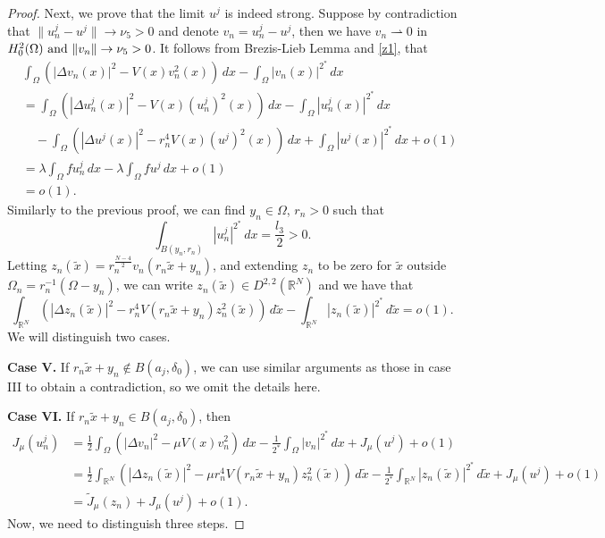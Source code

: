 \documentclass[reqno]{amsart}
\begin{document}
\begin{proof}
Next, we prove that the limit \(u^j\) is indeed strong. Suppose by contradiction that 
\(\|u_n^j-u^j\|\to \nu_5> 0\) and denote \(v_n=u_n^j-u^j\), then we have 
\(v_n\rightharpoonup 0\) in \(H^2_0(\Omega)$ and $\|v_n\|\to \nu_5> 0\).
It follows from Brezis-Lieb Lemma and \eqref{z1}, that
 \begin{align*}
&\int_{\Omega}\left( |\Delta v_n(x)|^2- V(x)v_n^2(x)\right)\, dx
 -\int_{\Omega}|v_n(x)|^{2^*}\,dx\\
&=\int_{\Omega}\left( |\Delta u^j_n(x)|^2-V(x)(u^j_n)^2(x)\right) \,dx
 -\int _{\Omega}|u^j_n(x)|^{2^*}\,dx\\
& \quad - \int_{\Omega}\left( |\Delta u^j(x)|^2-r_n^4 V(x)(u^j)^2(x)\right) \,dx
 +\int _{\Omega}|u^j(x)|^{2^*}\,dx+o(1)\\
&=\lambda \int_{\Omega} fu_n^j\,dx-\lambda \int_{\Omega} fu^j\,dx+o(1)\\
&=o(1).
\end{align*}
Similarly to the previous proof, we can find \(y_n\in \Omega\), \(r_n>0\) such that 
\[
 \int _{B(y_n, r_n)}|u_n^j|^{2^*}\,dx=\frac{l_3}{2}>0.
 \]
Letting \(z_n(\tilde{x})=r_n^{\frac{N-4}{2}}v_n(r_n\tilde{x}+y_n)\), 
and extending \(z_n\) to be zero for \(\tilde{x}\) outside 
\(\Omega_n=r_n^{-1}(\Omega-y_n)\), we can write 
\(z_n(\tilde{x})\in D^{2,2}(\mathbb{R}^N)\) and we have that
\begin{equation}\label{z2}
 \int_{\mathbb{R}^N}\left( |\Delta z_n(\tilde{x})|^2-r_n^4 V(r_n\tilde{x}+y_n)z_n^2(\tilde{x})\right)\, d\tilde{x}-\int _{\mathbb{R}^N}|z_n(\tilde{x})|^{2^*}\,d\tilde{x}=o(1).
\end{equation}
We will distinguish two cases.
\smallskip

\noindent \textbf{Case V.} 
If \(r_n\tilde{x}+y_n \notin B(a_j, \delta_0)\), we can use similar arguments as 
those in case III to obtain a contradiction,
so we omit the details here.
\smallskip

\noindent\textbf{Case VI.} If \(r_n\tilde{x}+y_n \in B(a_j, \delta_0)\), then
 \begin{align*}
 J_{\mu}(u_n^j)
 &=\frac{1}{2}\int_{\Omega}(|\Delta v_n|^2-\mu V(x)v_n^2)\,dx-\frac{1}{2^*} \int_{\Omega} |v_n|^{2^*}\,dx+J_{\mu}(u^j)+o(1)\\
 &=\frac{1}{2}\int_{\mathbb{R}^N}\left( |\Delta z_n(\tilde{x})|^2
 -\mu r_n^4 V(r_n\tilde{x}+y_n)z_n^2(\tilde{x})\right)\,d\tilde{x}-\frac{1}{2^*}
 \int _{\mathbb{R}^N}|z_n(\tilde{x})|^{2^*}\,d\tilde{x}
  +J_{\mu}(u^j)+o(1)\\
 &=\tilde{J}_\mu(z_n)+J_{\mu}(u^j)+o(1).
 \end{align*}
 Now, we need to distinguish three steps.
\smallskip


\end{proof}
\end{document}
